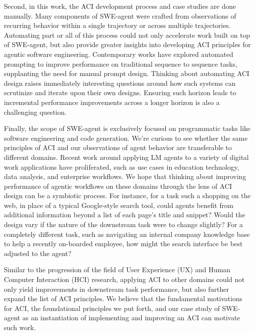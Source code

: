 Second, in this work, the ACI development process and case studies are done manually.
Many components of SWE-agent were crafted from observations of recurring behavior within a single trajectory or across multiple trajectories.
Automating part or all of this process could not only accelerate work built on top of SWE-agent, but also provide greater insights into developing ACI principles for agentic software engineering.
Contemporary works have explored automated prompting to improve performance on traditional sequence to sequence tasks, supplanting the need for manual prompt design.
Thinking about automating ACI design raises immediately interesting questions around how such systems can scrutinize and iterate upon their own designs. Ensuring such horizon leads to incremental performance improvements across a longer horizon is also a challenging question.

Finally, the scope of SWE-agent is exclusively focused on programmatic tasks like software engineering and code generation.
We're curious to see whether the same principles of ACI and our observations of agent behavior are transferable to different domains.
Recent work around applying LM agents to a variety of digital work applications have proliferated, such as use cases in education technology, data analysis, and enterprise workflows.
We hope that thinking about improving performance of agentic workflows on these domains through the lens of ACI design can be a symbiotic process.
For instance, for a task such a shopping on the web, in place of a typical Google-style search tool, could agents benefit from additional information beyond a list of each page’s title and snippet?
Would the design vary if the nature of the downstream task were to change slightly?
For a completely different task, such as navigating an internal company knowledge base to help a recently on-boarded employee, how might the search interface be best adjusted to the agent?

Similar to the progression of the field of User Experience (UX) and Human Computer Interaction (HCI) research, applying ACI to other domains could not only yield improvements in downstream task performance, but also further expand the list of ACI principles.
We believe that the fundamental motivations for ACI, the foundational principles we put forth, and our case study of SWE-agent as an instantiation of implementing and improving an ACI can motivate such work.